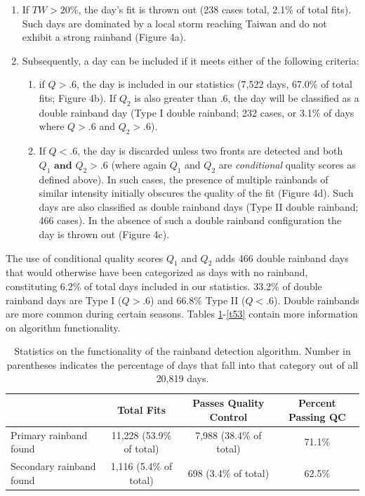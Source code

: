 \begin{enumerate}

	\item If $TW > 20\%$, the day's fit is thrown out (238 cases total, 2.1\% of total fits). Such days are dominated by a local storm reaching Taiwan and do not exhibit a strong rainband (Figure 4a).  
	
	\item Subsequently, a day can be included if it meets either of the following criteria:
	
	\begin{enumerate} 
	
	\item if $Q>.6$, the day is included in our statistics (7,522 days, 67.0\% of total fits; Figure 4b). If $Q_2$ is also greater than .6, the day will be classified as a double rainband day (Type I double rainband; 232 cases, or 3.1\% of days where $Q>.6$ and $Q_2>.6$).
		
	\item If $Q<.6$, the day is discarded unless two fronts are detected and both $Q_1 \mathrm{\textbf{ and }} Q_2 > .6$ (where again $Q_1$ and $Q_2$ are \textit{conditional} quality scores as defined above). In such cases, the presence of multiple rainbands of similar intensity initially obscures the quality of the fit (Figure 4d). Such days are also classified as double rainband days (Type II double rainband; 466 cases). In the absence of such a double rainband configuration the day is thrown out (Figure 4c).
	
	\end{enumerate}
	
\end{enumerate}	

	The use of conditional quality scores $Q_1$ and $Q_2$ adds 466 double rainband days that would otherwise have been categorized as days with no rainband, constituting 6.2\% of total days included in our statistics. 33.2\% of double rainband days are Type I ($Q>.6$) and 66.8\% Type II ($Q<.6$). Double rainbands are more common during certain seasons. Tables \ref{t51}-\ref{t53} contain more information on algorithm functionality. 

\begin{table}

\caption{Statistics on the functionality of the rainband detection algorithm. Number in parentheses indicates the percentage of days that fall into that category out of all 20,819 days.}
\centering

\begin{tabular}{ l c c c}
	  & Total Fits & Passes Quality Control & Percent Passing QC\\
	 \hline
	 Primary rainband found & 11,228 (53.9\% of total) & 7,988 (38.4\% of total) & 71.1\% \\
	 Secondary rainband found & 1,116 (5.4\% of total) & 698 (3.4\% of total) & 62.5\% \\
\end{tabular}
\label{t51}
\end{table}


